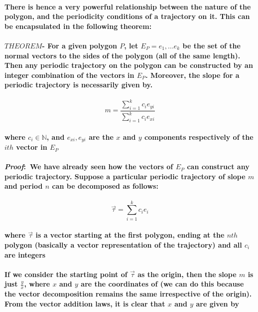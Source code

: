 \documentclass{report}
\begin{document}

\paragraph{There is hence a very powerful relationship between the nature of the polygon, and the periodicity conditions of a trajectory on it. This can be encapsulated in the following theorem:}

\paragraph{$THEOREM$- For a given polygon $P$, let $E_P = {e_1,...e_k}$ be the set of the normal vectors to the sides of the polygon (all of the same length). Then any periodic trajectory on the polygon can be constructed by an integer combination of the vectors in $E_P$. Moreover, the slope for a periodic trajectory is necessarily given by.}

\begin{equation}
m=\frac{\sum_{i=1}^k  c_ie_{yi} }{\sum_{i=1}^k  c_ie_{xi} }  
\end{equation}

\paragraph{where $c_i \in \mathbb{N}$, and $e_{xi}, e_{yi}$ are the $x$ and $y$ components respectively of the $ith$ vector in $E_P$}

\paragraph{\textit{Proof}:~We have already seen how the vectors of $E_P$ can construct any periodic trajectory. Suppose a particular periodic trajectory of slope $m$ and period $n$ can be decomposed as follows:}

\begin{equation}
\vec{\tau}=\sum_{i=1}^k c_ie_i 
\end{equation}

\paragraph{where $\vec{\tau}$ is a vector starting at the first polygon, ending at the $nth$ polygon (basically a vector representation of the trajectory) and all $c_i$ are integers}

\paragraph{If we consider the starting point of $\vec{\tau}$ as the origin, then the slope $m$ is just $\frac{y}{x}$, where $x$ and $y$ are the coordinates of (we can do this because the vector decomposition remains the same irrespective of the origin). From the vector addition laws, it is clear that $x$ and $y$ are given by}
\end{document}
